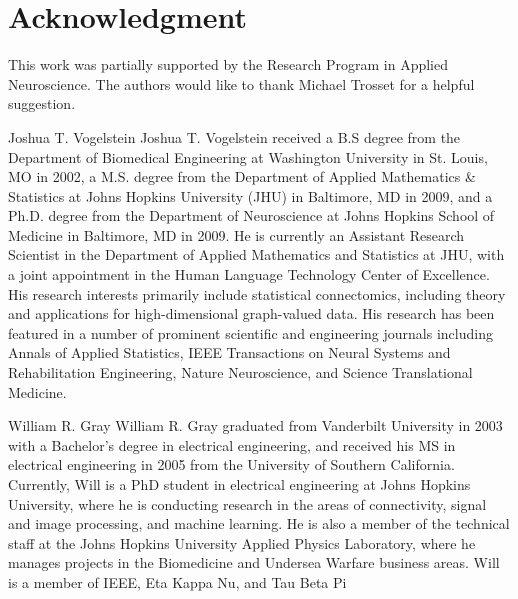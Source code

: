 \documentclass[10pt,journal,cspaper,compsoc]{IEEEtran}
\begin{document}
  \section*{Acknowledgment}
\fi

This work was partially supported by the Research Program in Applied Neuroscience. The authors would like to thank Michael Trosset for a helpful suggestion.

\ifCLASSOPTIONcaptionsoff
  \newpage
\fi





\begin{IEEEbiographynophoto}{Joshua T. Vogelstein}
Joshua T. Vogelstein received a B.S degree from the Department of Biomedical Engineering at Washington University in St. Louis, MO in 2002, a M.S. degree from the Department of Applied Mathematics \& Statistics at Johns Hopkins University (JHU) in Baltimore, MD in 2009, and a Ph.D. degree from the Department of Neuroscience at Johns Hopkins School of Medicine in Baltimore, MD in 2009.  He is currently an Assistant Research Scientist in the Department of Applied Mathematics and Statistics at JHU, with a joint appointment in the Human Language Technology Center of Excellence.  His research interests primarily include statistical connectomics, including theory and applications for high-dimensional graph-valued data. His research has been featured in a number of prominent scientific and engineering journals including Annals of Applied Statistics, IEEE Transactions on Neural Systems and Rehabilitation Engineering, Nature Neuroscience, and Science Translational Medicine.
\end{IEEEbiographynophoto}

\begin{IEEEbiographynophoto}{William R. Gray}
William R. Gray graduated from Vanderbilt University in 2003 with a Bachelor’s degree in electrical engineering, and received his MS in electrical engineering in 2005 from the University of Southern California.  Currently, Will is a PhD student in electrical engineering at Johns Hopkins University, where he is conducting research in the areas of connectivity, signal and image processing, and machine learning.  He is also a member of the technical staff at the Johns Hopkins University Applied Physics Laboratory, where he manages projects in the Biomedicine and Undersea Warfare business areas.  Will is a member of IEEE, Eta Kappa Nu, and Tau Beta Pi
\end{IEEEbiographynophoto}
\end{document}
